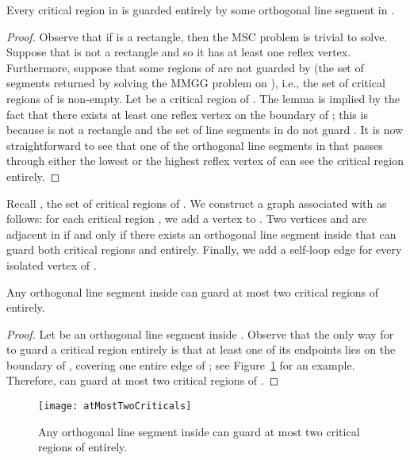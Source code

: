 \documentclass{llncs}
\begin{document}
\begin{lemma}
\label{lem:atLeastOneSegment}
Every critical region in  is guarded entirely by some orthogonal line segment in .
\end{lemma}
\begin{proof}
Observe that if  is a rectangle, then the MSC problem is trivial to solve. 
Suppose that  is not a rectangle
and so it has at least one reflex vertex.
Furthermore, suppose that some regions of  are not guarded by  (the set of segments returned by
solving the MMGG problem on ), i.e., the set  of critical regions of  is non-empty.
Let  be a critical region of . The lemma is implied by the fact that there exists at least one
reflex vertex on the boundary of ; this is because  is not a rectangle and the set of line segments in
 do not guard . It is now
straightforward to see that one of the orthogonal line segments in  that passes through either the lowest or
the highest reflex vertex of  can see the critical region  entirely.
\end{proof}

Recall , the set of critical regions of . We construct a graph  associated with 
as follows: for each critical region , we add a vertex  to . Two vertices
 and  are adjacent in  if and only if there exists an orthogonal line segment inside
 that can guard both critical regions  and  entirely. Finally, we add a self-loop edge for every
isolated vertex of .



\begin{lemma}
\label{lem:atMostTwoCriticals}
Any orthogonal line segment inside  can guard at most two critical regions of  entirely.
\end{lemma}
\begin{proof}
Let  be an orthogonal line segment inside . Observe that the only way for  to guard a critical region  entirely is that at least
one of its endpoints lies on the boundary of , covering one entire edge of ; see Figure~\ref{fig:atMostTwoCriticals} for an example.
Therefore,  can guard at most two critical regions of .
\end{proof}



\begin{figure}[t]
\centering \texttt{[image: atMostTwoCriticals]}
\caption{Any orthogonal line segment inside  can guard at most two critical regions
of  entirely.}
\label{fig:atMostTwoCriticals}\end{figure}
\end{document}
